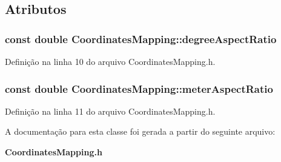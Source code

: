 \subsection{Atributos}
\subsubsection[{degree\+Aspect\+Ratio}]{\setlength{\rightskip}{0pt plus 5cm}const double Coordinates\+Mapping\+::degree\+Aspect\+Ratio\hspace{0.3cm}{\ttfamily [static]}}\label{class_coordinates_mapping_ada8a80fab1bc50b6e4db8d0e3755ff5f}


Definição na linha 10 do arquivo Coordinates\+Mapping.\+h.

\subsubsection[{meter\+Aspect\+Ratio}]{\setlength{\rightskip}{0pt plus 5cm}const double Coordinates\+Mapping\+::meter\+Aspect\+Ratio\hspace{0.3cm}{\ttfamily [static]}}\label{class_coordinates_mapping_a402e5dfce1d92edf56f4873029059a51}


Definição na linha 11 do arquivo Coordinates\+Mapping.\+h.



A documentação para esta classe foi gerada a partir do seguinte arquivo\+:\begin{DoxyCompactItemize}
\item 
{\bf Coordinates\+Mapping.\+h}\end{DoxyCompactItemize}
